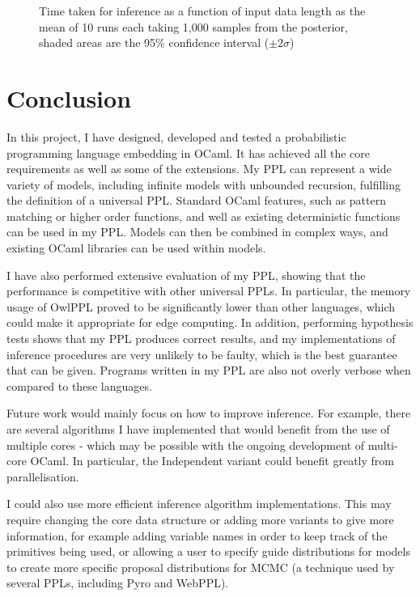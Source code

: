 \documentclass[sigconf]{acmart}
\begin{document}
\begin{figure}[!ht]
  \centering
  
  \caption{Time taken for inference as a function of input data length as the mean of 10 runs each taking 1,000 samples from the posterior, shaded areas are the 95\% confidence interval ($\pm 2\sigma$)}
  \label{fig:time-datasize}
\end{figure}


\section{Conclusion}
\label{s:conclusion}

In this project, I have designed, developed and tested a probabilistic programming language embedding in OCaml. It has achieved all the core requirements as well as some of the extensions. My PPL can represent a wide variety of models, including infinite models with unbounded recursion, fulfilling the definition of a universal PPL. Standard OCaml features, such as pattern matching or higher order functions, and well as existing deterministic functions can be used in my PPL. Models can then be combined in complex ways, and existing OCaml libraries can be used within models.

I have also performed extensive evaluation of my PPL, showing that the performance is competitive with other universal PPLs. In particular, the memory usage of OwlPPL proved to be significantly lower than other languages, which could make it appropriate for edge computing. In addition, performing hypothesis tests shows that my PPL produces correct results, and my implementations of inference procedures are very unlikely to be faulty, which is the best guarantee that can be given. Programs written in my PPL are also not overly verbose when compared to these languages.

Future work would mainly focus on how to improve inference. For example, there are several algorithms I have implemented that would benefit from the use of multiple cores - which may be possible with the ongoing development of multi-core OCaml. In particular, the Independent variant could benefit greatly from parallelisation.

I could also use more efficient inference algorithm implementations. This may require changing the core data structure or adding more variants to give more information, for example adding variable names in order to keep track of the primitives being used, or allowing a user to specify guide distributions for models to create more specific proposal distributions for MCMC (a technique used by several PPLs, including Pyro and WebPPL).
\end{document}
